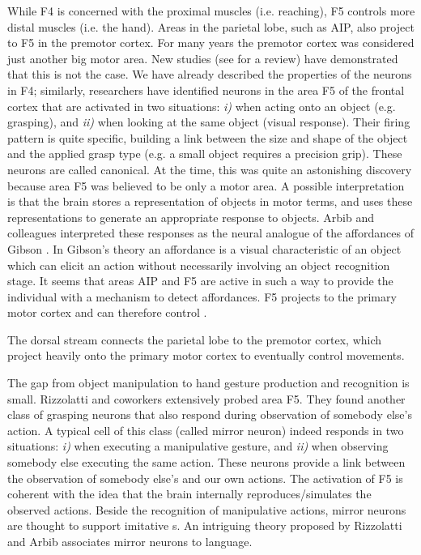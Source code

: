 While F4 is concerned with the proximal muscles (i.e. reaching), F5
controls more distal muscles (i.e. the hand). Areas in the parietal 
lobe, such as AIP, also project to F5 in the premotor cortex.
For many years the premotor cortex was considered
just another big motor area. New studies (see \cite{jeannerod97cognitive} for a review) 
have demonstrated that this is not the case. We have already described the
properties of the neurons in F4; similarly, researchers have 
identified neurons in the area F5 of the frontal cortex \cite{fadiga00visuomotor} 
that are activated in two situations: {\it i)} when acting onto an object 
(e.g. grasping), and {\it ii)} when looking at the same object (visual response). 
Their firing pattern is quite specific, building a link between the size 
and shape of the object and the applied grasp type (e.g. a small object 
requires a precision grip). These neurons are called canonical. At the time,
this was quite an astonishing discovery because area F5 was believed 
to be only a motor area. A possible interpretation is that the brain 
stores a representation of objects in motor terms, and uses these 
representations to generate an appropriate response to objects. 
Arbib and colleagues \cite{fagg-arbib-1998} interpreted
these responses as the neural analogue of the affordances of Gibson 
\cite{gibson77theory}. In Gibson's theory an affordance is a visual
characteristic of an object which can elicit an action without necessarily
involving an object recognition stage. It seems that areas AIP and F5 are 
active in such a way to provide the individual with a mechanism to 
detect affordances. F5 projects to the primary motor cortex and can 
therefore control \ahhbehavior{}.

\ifverbose
The dorsal stream connects the parietal lobe to the premotor cortex,
which project heavily onto the primary motor cortex to eventually
control movements.
\fi

The gap from object manipulation to hand gesture production and 
recognition is small.
Rizzolatti and coworkers \cite{gallese-fadiga-fogassi-rizzolatti-1996}
extensively probed area F5. They found another class of grasping
neurons that also respond during observation of somebody else's action.
A typical cell of this class (called mirror neuron) indeed responds in two
situations: {\it i)} when executing a manipulative gesture, and {\it
ii)} when observing somebody else executing the same action. These
neurons provide a link between the observation of somebody else's
and our own actions. The activation of F5 is coherent with the idea
that the brain internally reproduces/simulates the observed actions.
Beside the recognition of manipulative actions, mirror neurons are 
thought to support imitative \ahhbehavior s. An intriguing theory
proposed by Rizzolatti and Arbib \cite{rizzolatti98language}
associates mirror neurons to language.

